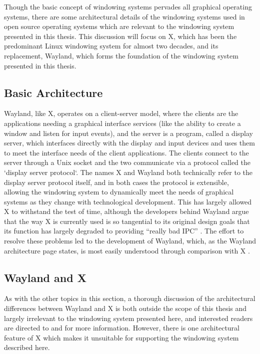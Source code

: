 Though the basic concept of windowing systems pervades all graphical operating systems, there are some architectural details of the windowing systems used in open source operating systems which are relevant to the windowing system presented in this thesis. This discussion will focus on X, which has been the predominant Linux windowing system for almost two decades, and its replacement, Wayland, which forms the foundation of the windowing system presented in this thesis.

\subsection{Basic Architecture}

Wayland, like X, operates on a client-server model, where the clients are the applications needing a graphical interface services (like the ability to create a window and listen for input events), and the server is a program, called a display server, which interfaces directly with the display and input devices and uses them to meet the interface needs of the client applications. The clients   connect to the server through a Unix socket and the two communicate via a protocol called the `display server protocol`. The names X and Wayland both technically refer to the display server protocol itself, and in both cases the protocol is extensible, allowing the windowing system to dynamically meet the needs of graphical systems as they change with technological development. This has largely allowed X to withstand the test of time, although the developers behind Wayland argue that the way X is currently used is so tangential to its original design goals that its function has largely degraded to providing “really bad IPC” \cite{real-story-wayland}. The effort to resolve these problems led to the development of Wayland, which, as the Wayland architecture page states, is most easily understood through comparison with X \cite{wayland}.

\subsection{Wayland and X}
\label{sec:wayland-and-x}

As with the other topics in this section, a thorough discussion of the architectural differences between Wayland and X is both outside the scope of this thesis and largely irrelevant to the windowing system presented here, and interested readers are directed to \cite{wayland} and \cite{real-story-wayland} for more information. However, there is one architectural feature of X which makes it unsuitable for supporting the windowing system described here.

